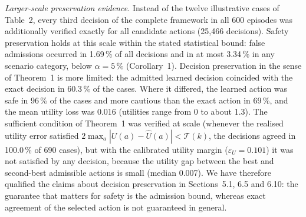 \documentclass[11pt]{article}
\begin{document}
\emph{Larger-scale preservation evidence.} Instead of the twelve illustrative cases of Table~2, every third decision of the
complete framework in all 600 episodes was additionally verified exactly for all candidate actions
(25,466 decisions). Safety preservation holds at this scale within the stated statistical bound: false admissions
occurred in 1.69\,\% of all decisions and in at most 3.34\,\% in any
scenario category, below $\alpha=5\,\%$ (Corollary~1). Decision preservation in the sense of Theorem~1 is more limited: the admitted
learned decision coincided with the exact decision in 60.3\,\% of the cases. Where it differed, the
learned action was safe in 96\,\% of the cases and more cautious than the
exact action in 69\,\%, and the mean utility loss was
0.016 (utilities range from 0 to about 1.3). The sufficient condition of Theorem~1 was
verified at scale (whenever the realised utility error satisfied $2\max_a|U(a)-\hat U(a)|<\mathcal{T}(k)$, the decisions agreed in
100.0\,\% of 690 cases), but with the calibrated utility margin
($\varepsilon_U=0.101$) it was not satisfied by any decision, because the utility gap between the best and second-best admissible actions is small (median 0.007).
We have therefore qualified the claims about decision preservation in Sections~5.1, 6.5 and 6.10: the guarantee that matters for
safety is the admission bound, whereas exact agreement of the selected action is not guaranteed in general.
\end{document}
